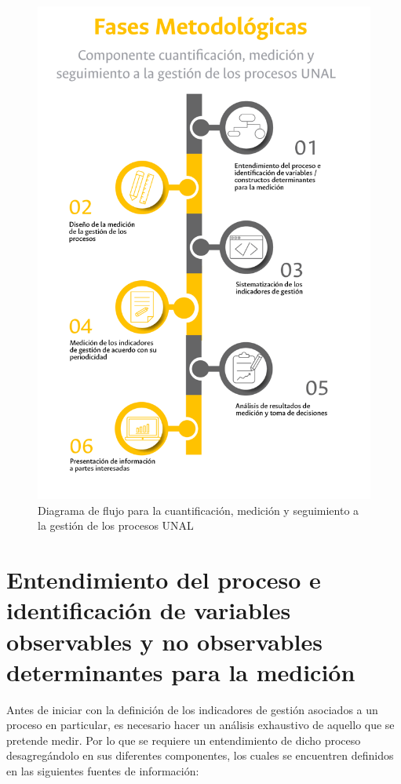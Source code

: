 \documentclass[
]{book}
\begin{document}
\begin{figure}

{\centering \includegraphics[width=0.7\linewidth]{Imagenes/figura_3} 

}

\caption{Diagrama de flujo para la cuantificación, medición y seguimiento a la gestión de los procesos UNAL}\label{fig:figura3}
\end{figure}

\hypertarget{entendimiento-del-proceso-e-identificaciuxf3n-de-variables-observables-y-no-observables-determinantes-para-la-mediciuxf3n}{%
\section{Entendimiento del proceso e identificación de variables observables y no observables determinantes para la medición}\label{entendimiento-del-proceso-e-identificaciuxf3n-de-variables-observables-y-no-observables-determinantes-para-la-mediciuxf3n}}

Antes de iniciar con la definición de los indicadores de gestión asociados a un proceso en particular, es necesario hacer un análisis exhaustivo de aquello que se pretende medir. Por lo que se requiere un entendimiento de dicho proceso desagregándolo en sus diferentes componentes, los cuales se encuentren definidos en las siguientes fuentes de información:
\end{document}
